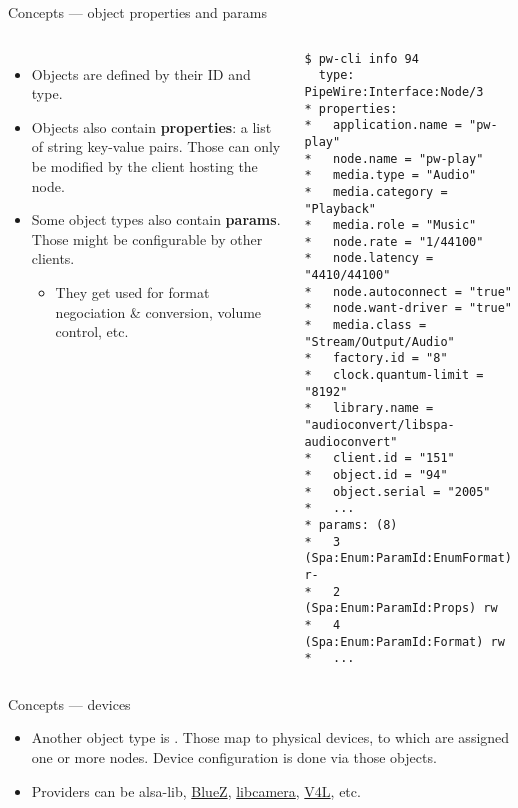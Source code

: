 \begin{frame}[fragile]{Concepts — object properties and params}
  \begin{columns}

      \begin{itemize}
      \item Objects are defined by their ID and type.

      \item Objects also contain \textbf{properties}: a list of string
        key-value pairs. Those can only be modified by the client
        hosting the node.

      \item Some object types also contain \textbf{params}. Those might
        be configurable by other clients.

        \begin{itemize}
        \item They get used for format negociation \& conversion,
          volume control, etc.
        \end{itemize}
      \end{itemize}

    \begin{block}{}
      \fontsize{8}{8}\selectfont
        \begin{verbatim}
$ pw-cli info 94
  type: PipeWire:Interface:Node/3
* properties:
*   application.name = "pw-play"
*   node.name = "pw-play"
*   media.type = "Audio"
*   media.category = "Playback"
*   media.role = "Music"
*   node.rate = "1/44100"
*   node.latency = "4410/44100"
*   node.autoconnect = "true"
*   node.want-driver = "true"
*   media.class = "Stream/Output/Audio"
*   factory.id = "8"
*   clock.quantum-limit = "8192"
*   library.name = "audioconvert/libspa-audioconvert"
*   client.id = "151"
*   object.id = "94"
*   object.serial = "2005"
*   ...
* params: (8)
*   3 (Spa:Enum:ParamId:EnumFormat) r-
*   2 (Spa:Enum:ParamId:Props) rw
*   4 (Spa:Enum:ParamId:Format) rw
*   ...
        \end{verbatim}
      \end{block}

  \end{columns}
\end{frame}



\begin{frame}{Concepts — devices}
  \begin{itemize}

  \item Another object type is . Those map to physical
    devices, to which are assigned one or more nodes. Device
    configuration is done via those objects.

  \item Providers can be alsa-lib, \href{https://www.bluez.org/}{BlueZ},
    \href{https://libcamera.org/}{libcamera},
    \href{https://en.wikipedia.org/wiki/Video4Linux}{V4L}, etc.

  \end{itemize}
\end{frame}



